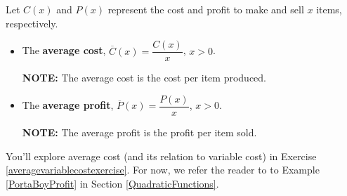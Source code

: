 \begin{tcolorbox}

\begin{defn} \label{averagecostprofit} Let $C(x)$ and $P(x)$ represent the cost and profit to make and sell $x$ items, respectively.

\begin{itemize}

\item    The  \textbf{average cost}, $\overline{C}(x) = \dfrac{C(x)}{x}$, $x > 0$.  

\textbf{NOTE:}  The average cost is the cost per item produced.

\item   The  \textbf{average profit}, $\overline{P}(x) = \dfrac{P(x)}{x}$, $x > 0$.  

\textbf{NOTE:}  The average profit is the profit  per item sold.

\end{itemize}

\end{defn}

\end{tcolorbox}

You'll explore average cost (and its relation to variable cost) in Exercise \ref{averagevariablecostexercise}.  For now, we refer the reader to to Example \ref{PortaBoyProfit}  in Section \ref{QuadraticFunctions}.

